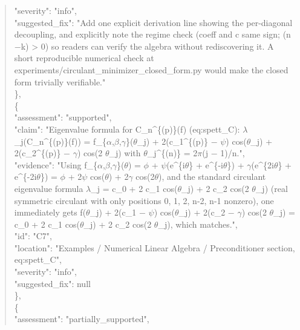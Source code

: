 \documentclass[11pt]{article}
\begin{document}
\begin{quote}
      "severity": "info",\\
      "suggested\_fix": "Add one explicit derivation line showing the per-diagonal decoupling, and explicitly note the regime check (coeff and c same sign; (n\ensuremath{-}k) > 0) so readers can verify the algebra without rediscovering it. A short reproducible numerical check at experiments/circulant\_minimizer\_closed\_form.py would make the closed form trivially verifiable."\\
    \},\\
    \{\\
      "assessment": "supported",\\
      "claim": "Eigenvalue formula for C\_n\^{}\{(p)\}(f) (eq:spett\_C): \ensuremath{\lambda}\_j(C\_n\^{}\{(p)\}(f)) = f\_\{\ensuremath{\alpha},\ensuremath{\beta},\ensuremath{\gamma}\}(\ensuremath{\theta}\_j) + 2(c\_1\^{}\{(p)\} \ensuremath{-} \ensuremath{\psi}) cos(\ensuremath{\theta}\_j) + 2(c\_2\^{}\{(p)\} \ensuremath{-} \ensuremath{\gamma}) cos(2 \ensuremath{\theta}\_j) with \ensuremath{\theta}\_j\^{}\{(n)\} = 2\ensuremath{\pi}(j \ensuremath{-} 1)/n.",\\
      "evidence": "Using f\_\{\ensuremath{\alpha},\ensuremath{\beta},\ensuremath{\gamma}\}(\ensuremath{\theta}) = \ensuremath{\phi} + \ensuremath{\psi}(e\^{}\{i\ensuremath{\theta}\} + e\^{}\{-i\ensuremath{\theta}\}) + \ensuremath{\gamma}(e\^{}\{2i\ensuremath{\theta}\} + e\^{}\{-2i\ensuremath{\theta}\}) = \ensuremath{\phi} + 2\ensuremath{\psi} cos(\ensuremath{\theta}) + 2\ensuremath{\gamma} cos(2\ensuremath{\theta}), and the standard circulant eigenvalue formula \ensuremath{\lambda}\_j = c\_0 + 2 c\_1 cos(\ensuremath{\theta}\_j) + 2 c\_2 cos(2 \ensuremath{\theta}\_j) (real symmetric circulant with only positions 0, 1, 2, n-2, n-1 nonzero), one immediately gets f(\ensuremath{\theta}\_j) + 2(c\_1 \ensuremath{-} \ensuremath{\psi}) cos(\ensuremath{\theta}\_j) + 2(c\_2 \ensuremath{-} \ensuremath{\gamma}) cos(2 \ensuremath{\theta}\_j) = c\_0 + 2 c\_1 cos(\ensuremath{\theta}\_j) + 2 c\_2 cos(2 \ensuremath{\theta}\_j), which matches.",\\
      "id": "C7",\\
      "location": "Examples / Numerical Linear Algebra / Preconditioner section, eq:spett\_C",\\
      "severity": "info",\\
      "suggested\_fix": null\\
    \},\\
    \{\\
      "assessment": "partially\_supported",\\

\end{quote}
\end{document}
